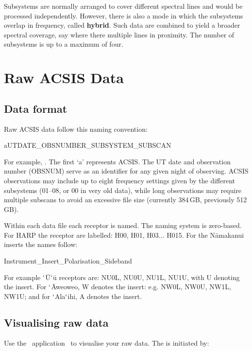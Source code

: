 \documentclass[11pt,oneside,chapters]{starlink}
\begin{document}
Subsystems are normally arranged to cover different spectral lines and
would be processed independently.  However, there is also a mode in
which the subsystems overlap in frequency, called \textbf{hybrid}.
Such data are combined to yield a broader spectral coverage, say where
there multiple lines in proximity.  The number of subsystems is
up to a maximum of four.

\clearpage
\chapter{Raw ACSIS Data}
\label{sec:raw}

\section{Data format}
Raw ACSIS data follow this naming convention:

aUTDATE\_OBSNUMBER\_SUBSYSTEM\_SUBSCAN

For example, . The first `a' represents
ACSIS. The UT date and observation number (OBSNUM) serve as an
identifier for any given night of observing. ACSIS observations may
include up to eight frequency settings given by the different
subsystems (01--08, or 00 in very old data), while long observations may require multiple
subscans to avoid an excessive file size
(currently 384\,GB, previously 512\,GB).

Within each data file each receptor is named. The naming system is
zero-based. For HARP the receptor are labelled: H00, H01, H03... H015.
For the N\=amakanui inserts the names follow:

Instrument\_Insert\_Polarisation\_Sideband

For example $`$\=U$`$\=u receptors are: NU0L, NU0U, NU1L, NU1U,
with U denoting the insert. For $`$\=Aweoweo, W denotes the insert:
e.g. NW0L, NW0U, NW1L, NW1U; and for $`$Ala$`$ihi, A denotes the insert.

\section{Visualising raw data}
\label{sec:exam}

Use the \starlink\ application \gaia\ to visualise your raw data. The
is initiated by:

\begin{terminalv}
\end{terminalv}
\end{document}
